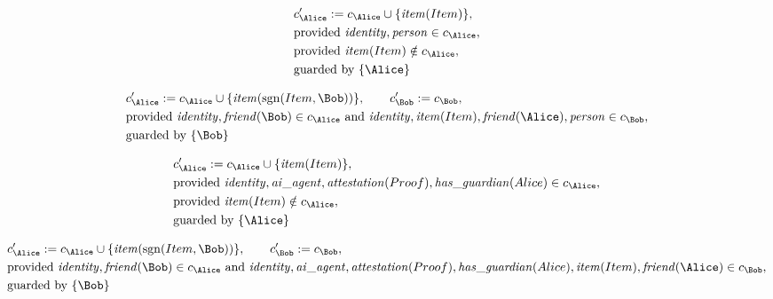 \begin{align*}
&
c'_
{
\Alice
}
 := 
c_
{
\Alice
}
 \cup 
\{
\mathit{\detokenize{
item
}}
(
Item
)
\}
,\\
&
\text{provided } 
\mathit{\detokenize{
identity
}}
,
\mathit{\detokenize{
person
}}
 \in c_
{
\Alice
}
,\\
&
\text{provided } 
\mathit{\detokenize{
item
}}
(
Item
)
 \notin c_
{
\Alice
}
,\\
&
\text{guarded by } \{
\Alice
\}
\end{align*}

\begin{align*}
&
c'_
{
\Alice
}
 := 
c_
{
\Alice
}
 \cup 
\{
\mathit{\detokenize{
item
}}
(
\mathrm{sgn}(
Item
,
\Bob
)
)
\}
, \qquad 
c'_
{
\Bob
}
 := 
c_
{
\Bob
}
,\\
&
\text{provided } 
\mathit{\detokenize{
identity
}}
,
\mathit{\detokenize{
friend
}}
(
\Bob
)
 \in c_
{
\Alice
}
 \text{ and } 
\mathit{\detokenize{
identity
}}
,
\mathit{\detokenize{
item
}}
(
Item
)
,
\mathit{\detokenize{
friend
}}
(
\Alice
)
,
\mathit{\detokenize{
person
}}
 \in c_
{
\Bob
}
,\\
&
\text{guarded by } \{
\Bob
\}
\end{align*}

\begin{align*}
&
c'_
{
\Alice
}
 := 
c_
{
\Alice
}
 \cup 
\{
\mathit{\detokenize{
item
}}
(
Item
)
\}
,\\
&
\text{provided } 
\mathit{\detokenize{
identity
}}
,
\mathit{\detokenize{
ai_agent
}}
,
\mathit{\detokenize{
attestation
}}
(
Proof
)
,
\mathit{\detokenize{
has_guardian
}}
(
Alice
)
 \in c_
{
\Alice
}
,\\
&
\text{provided } 
\mathit{\detokenize{
item
}}
(
Item
)
 \notin c_
{
\Alice
}
,\\
&
\text{guarded by } \{
\Alice
\}
\end{align*}

\begin{align*}
&
c'_
{
\Alice
}
 := 
c_
{
\Alice
}
 \cup 
\{
\mathit{\detokenize{
item
}}
(
\mathrm{sgn}(
Item
,
\Bob
)
)
\}
, \qquad 
c'_
{
\Bob
}
 := 
c_
{
\Bob
}
,\\
&
\text{provided } 
\mathit{\detokenize{
identity
}}
,
\mathit{\detokenize{
friend
}}
(
\Bob
)
 \in c_
{
\Alice
}
 \text{ and } 
\mathit{\detokenize{
identity
}}
,
\mathit{\detokenize{
ai_agent
}}
,
\mathit{\detokenize{
attestation
}}
(
Proof
)
,
\mathit{\detokenize{
has_guardian
}}
(
Alice
)
,
\mathit{\detokenize{
item
}}
(
Item
)
,
\mathit{\detokenize{
friend
}}
(
\Alice
)
 \in c_
{
\Bob
}
,\\
&
\text{guarded by } \{
\Bob
\}
\end{align*}
